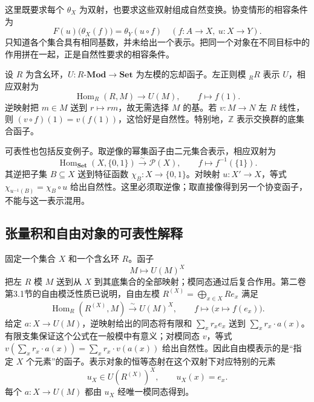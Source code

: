 这里既要求每个 \(\theta_X\) 为双射，也要求这些双射组成自然变换。协变情形的相容条件为
\[
	F(u)\bigl(\theta_X(f)\bigr)=\theta_Y(u\circ f) \quad(f:A\rightarrow X,\ u:X\rightarrow Y).
\]
只知道各个集合具有相同基数，并未给出一个表示。把同一个对象在不同目标中的作用拼在一起，正是自然性要求的相容条件。

\begin{example}\label{b4:exm:representable-forgetful}
	设 \(R\) 为含幺环，\(U:R\text{-}\mathbf{Mod}\rightarrow\mathbf{Set}\) 为左模的忘却函子。左正则模 \({}_RR\) 表示 \(U\)，相应双射为
	\[
		\operatorname{Hom}_R(R,M)\longrightarrow U(M),\qquad f\longmapsto f(1).
	\]
	逆映射把 \(m\in M\) 送到 \(r\mapsto rm\)，故无需选择 \(M\) 的基。若 \(v:M\rightarrow N\) 左 \(R\) 线性，则 \((v\circ f)(1)=v(f(1))\)，这恰好是自然性。特别地，\(\mathbb Z\) 表示交换群的底集合函子。
\end{example}

可表性也包括反变例子。取逆像的幂集函子由二元集合表示，相应双射为
\[
	\operatorname{Hom}_{\mathbf{Set}}(X,\{0,1\}) \xrightarrow{\sim}\mathcal P(X),\qquad f\longmapsto f^{-1}(\{1\}).
\]
其逆把子集 \(B\subseteq X\) 送到特征函数 \(\chi_B:X\rightarrow\{0,1\}\)。对映射 \(u:X'\rightarrow X\)，等式 \(\chi_{u^{-1}(B)}=\chi_B\circ u\) 给出自然性。这里必须取逆像；取直接像得到另一个协变函子，不能与这一表示混用。

\subsection{张量积和自由对象的可表性解释}
\label{b4:subsec:0301:02}

固定一个集合 \(X\) 和一个含幺环 \(R\)。函子
\[
	M\longmapsto U(M)^X
\]
把左 \(R\) 模 \(M\) 送到从 \(X\) 到其底集合的全部映射；模同态通过后复合作用。第二卷第3.1节的自由模泛性质已说明，自由左模 \(R^{(X)}=\bigoplus_{x\in X}Re_x\) 满足
\[
	\operatorname{Hom}_R(R^{(X)},M)\xrightarrow{\sim}U(M)^X, \qquad f\longmapsto\bigl(x\mapsto f(e_x)\bigr).
\]
给定 \(a:X\rightarrow U(M)\)，逆映射给出的同态将有限和 \(\sum_x r_xe_x\) 送到 \(\sum_xr_x\cdot a(x)\)。有限支集保证这个公式在一般模中有意义；对模同态 \(v\)，等式 \(v(\sum_xr_x\cdot a(x))=\sum_xr_x\cdot v(a(x))\) 给出自然性。因此自由模表示的是“指定 \(X\) 个元素”的函子。表示对象的恒等态射在这个双射下对应特别的元素
\[
	u_X\in U(R^{(X)})^X,\qquad u_X(x)=e_x.
\]
每个 \(a:X\rightarrow U(M)\) 都由 \(u_X\) 经唯一模同态得到。

